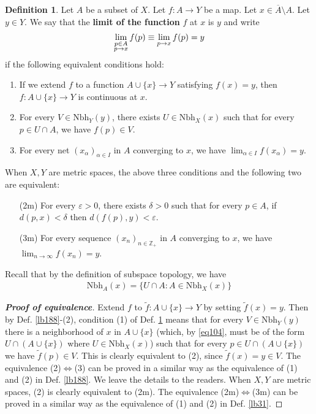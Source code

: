 \documentclass[12pt,b5paper,notitlepage]{article}
\theoremstyle{definition}
\newtheorem{df}{Definition}[section]
\theoremstyle{plain}
\newcommand{\wtd}{\widetilde}
\newcommand{\ovl}{\overline}
\newcommand{\Zbb}{\mathbb Z}
\newcommand{\Nbh}{\mathrm{Nbh}}
\newcommand{\eps}{\varepsilon}
\numberwithin{equation}{section}
\begin{document}
\begin{df}\label{lb197}
Let $A$ be a subset of $X$. Let $f:A\rightarrow Y$ be a map. Let $x\in\ovl A\setminus A$. Let $y\in Y$. We say that the \textbf{limit of the function}  $f$ at $x$ is $y$ and write 
\begin{align*}
\lim_{
\begin{subarray}{c}
p\in A\\
p\rightarrow x
\end{subarray}
} f(p)\equiv\lim_{p\rightarrow x}f(p)=y
\end{align*}
if the following equivalent conditions hold:
\begin{enumerate}[label=(\arabic*)]
\item If we extend $f$ to a function $A\cup\{x\}\rightarrow Y$ satisfying $f(x)=y$, then $f:A\cup\{x\}\rightarrow Y$ is continuous at $x$.
\item For every $V\in\Nbh_Y(y)$, there exists $U\in\Nbh_X(x)$ such that for every $p\in U\cap A$, we have $f(p)\in V$.
\item For every net $(x_\alpha)_{\alpha\in I}$ in $A$ converging to $x$, we have $\lim_{\alpha\in I} f(x_\alpha)=y$.
\end{enumerate}
When $X,Y$ are metric spaces, the above three conditions and the following two are equivalent:
\begin{itemize}
\item[(2m)] For every $\eps>0$, there exists $\delta>0$ such that for every $p\in A$, if $d(p,x)<\delta$ then $d(f(p),y)<\eps$.
\item[(3m)] For every sequence $(x_n)_{n\in\Zbb_+}$ in $A$ converging to $x$, we have $\lim_{n\rightarrow\infty}f(x_n)=y$.
\end{itemize}
\end{df}


Recall that by the definition of subspace topology, we have
\begin{align}
\Nbh_A(x)=\{U\cap A:A\in\Nbh_X(x)\}  \label{eq104}
\end{align}

\begin{proof}[\textbf{Proof of equivalence}]
Extend $f$ to $\wtd f:A\cup\{x\}\rightarrow Y$ by setting $\wtd f(x)=y$. Then by Def. \ref{lb188}-(2), condition (1) of Def. \ref{lb197} means that for every $V\in\Nbh_Y(y)$ there is a neighborhood of $x$ in $A\cup\{x\}$ (which, by \eqref{eq104}, must be of the form $U\cap (A\cup\{x\})$ where $U\in\Nbh_X(x)$) such that for every $p\in U\cap (A\cup\{x\})$ we have $\wtd f(p)\in V$. This is clearly equivalent to (2), since $\wtd f(x)=y\in V$. The equivalence (2)$\Leftrightarrow$(3) can be proved in a similar way as the equivalence of (1) and (2) in Def. \ref{lb188}. We leave the details to the readers. When $X,Y$ are metric spaces, (2) is clearly equivalent to (2m). The equivalence (2m)$\Leftrightarrow$(3m) can be proved in a similar way as the equivalence of (1) and (2) in Def. \ref{lb31}.
\end{proof}
\end{document}
